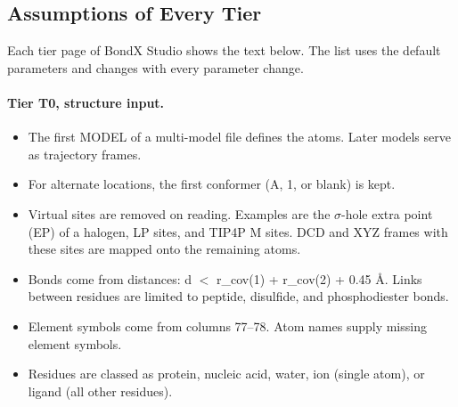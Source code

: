 \documentclass[journal=jcisd8,manuscript=suppinfo]{achemso}
\newcommand{\BX}{BondX Studio}
\begin{document}
\begin{singlespace}
\section{Assumptions of Every Tier}
\label{sec:assume}

Each tier page of \BX{} shows the text below. The list uses the default parameters and changes with every parameter change.

\paragraph{Tier T0, structure input.}
\begin{itemize}[nosep,leftmargin=*]
\item The first MODEL of a multi-model file defines the atoms. Later models serve as trajectory frames.
\item For alternate locations, the first conformer (A, 1, or blank) is kept.
\item Virtual sites are removed on reading. Examples are the $\sigma$-hole extra point (EP) of a halogen, LP sites, and TIP4P M sites. DCD and XYZ frames with these sites are mapped onto the remaining atoms.
\item Bonds come from distances: d $<$ r\_cov(1) + r\_cov(2) + 0.45 \AA{}. Links between residues are limited to peptide, disulfide, and phosphodiester bonds.
\item Element symbols come from columns 77--78. Atom names supply missing element symbols.
\item Residues are classed as protein, nucleic acid, water, ion (single atom), or ligand (all other residues).
\end{itemize}

\end{singlespace}
\end{document}
